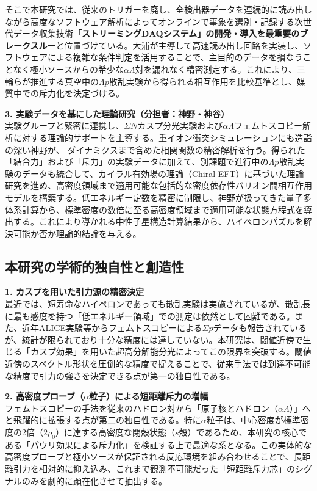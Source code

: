 \documentclass[11pt,a4j,dvipdfmx]{jarticle} 					%
\newcommand{\研究課題名}{加速器実験による短距離バリオン間相互作用の解明と中性子星ハイペロンパズルの解決}
\newcommand{\研究機関名}{東北大学}
\newcommand{\研究代表者氏名}{市川裕大}
\newcommand{\研究期間の最終元号年度}{13}
\begin{document}
そこで本研究では、従来のトリガーを廃し、全検出器データを連続的に読み出しながら高度なソフトウェア解析によってオンラインで事象を選別・記録する次世代データ収集技術\textbf{「ストリーミングDAQシステム」の開発・導入を最重要のブレークスルー}と位置づけている。大浦が主導して高速読み出し回路を実装し、ソフトウェアによる複雑な条件判定を活用することで、主目的のデータを損なうことなく極小ソースからの希少な$\alpha\Lambda$対を漏れなく精密測定する。これにより、三輪らが推進する真空中の$\Lambda p$散乱実験から得られる相互作用を比較基準とし、媒質中での斥力化を決定づける。



\vspace*{1.0zw}
\noindent
\textbf{3. 実験データを基にした理論研究（分担者：神野・神谷）}\\
実験グループと緊密に連携し、$\Sigma N$カスプ分光実験および$\alpha\Lambda$フェムトスコピー解析に対する理論的サポートを主導する。重イオン衝突シミュレーションにも造詣の深い神野が、
ダイナミクスまで含めた相関関数の精密解析を行う。得られた「結合力」および「斥力」の実験データに加えて、別課題で進行中の$\Lambda p$散乱実験のデータも統合して、カイラル有効場の理論（Chiral EFT）に基づいた理論研究を進め、高密度領域まで適用可能な包括的な密度依存性バリオン間相互作用モデルを構築する。低エネルギー定数を精密に制限し、神野が扱ってきた量子多体系計算から、標準密度の数倍に至る高密度領域まで適用可能な状態方程式を導出する。これにより導かれる中性子星構造計算結果から、ハイペロンパズルを解決可能か否か理論的結論を与える。

\subsection{本研究の学術的独自性と創造性}

\textbf{1. カスプを用いた引力源の精密決定}\\
最近では、短寿命なハイペロンであっても散乱実験は実施されているが、散乱長に最も感度を持つ「低エネルギー領域」での測定は依然として困難である。また、近年ALICE実験等からフェムトスコピーによる$\Sigma p$データも報告されているが、統計が限られており十分な精度には達していない。本研究は、閾値近傍で生じる「カスプ効果」を用いた超高分解能分光によってこの限界を突破する。閾値近傍のスペクトル形状を圧倒的な精度で捉えることで、従来手法では到達不可能な精度で引力の強さを決定できる点が第一の独自性である。

\textbf{2. 高密度プローブ（$\alpha$粒子）による短距離斥力の増幅}\\
フェムトスコピーの手法を従来のハドロン対から「原子核とハドロン（$\alpha\Lambda$）」へと飛躍的に拡張する点が第二の独自性である。特に$\alpha$粒子は、中心密度が標準密度の2倍（$2\rho_0$）に達する高密度な閉殻状態（$s$殻）であるため、本研究の核心である「パウリ効果による斥力化」を検証する上で最適な系となる。この実体的な高密度プローブと極小ソースが保証される反応環境を組み合わせることで、長距離引力を相対的に抑え込み、これまで観測不可能だった「短距離斥力芯」のシグナルのみを劇的に顕在化させて抽出する。
\end{document}
